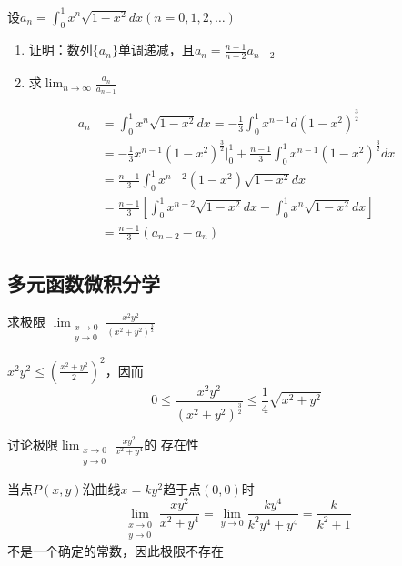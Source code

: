 \documentclass{article}
\begin{document}
\begin{examplle}[]
设\(a_n=\displaystyle\int_0^1x^n\sqrt{1-x^2}dx(n=0,1,2,\dots)\)
\begin{enumerate}
\item 证明：数列\(\{a_n\}\)单调递减，且\(a_n=\frac{n-1}{n+2}a_{n-2}\)
\item 求\(\displaystyle\lim_{n\to\infty}\frac{a_n}{a_{n-1}}\)
\end{enumerate}


\begin{align*}
a_n&=\int_0^1x^n\sqrt{1-x^2}dx=-\frac{1}{3}\int_0^1x^{n-1}d(1-x^2)^{\frac{3}{2}}\\
&=-\frac{1}{3}x^{n-1}(1-x^2)^{\frac{3}{2}}\Big\rvert_0^1+\frac{n-1}{3}
\int_0^1x^{n-1}(1-x^2)^{\frac{3}{2}}dx\\
&=\frac{n-1}{3}\int_0^1x^{n-2}(1-x^2)\sqrt{1-x^2}dx \\
&=\frac{n-1}{3}\left[
\int_0^1x^{n-2}\sqrt{1-x^2}dx-\int_0^1x^n\sqrt{1-x^2}dx
\right]\\
&=\frac{n-1}{3}(a_{n-2}-a_n)
\end{align*}
\end{examplle}
\subsection{多元函数微积分学}
\label{sec:org0dc937b}
\begin{examplle}[]
求极限
\(\displaystyle\lim_{\substack{x\to0\\y\to0}}\frac{x^2y^2}{(x^2+y^2)^{\frac{3}{2}}}\)

\(x^2y^2\le(\frac{x^2+y^2}{2})^2\)，因而
\begin{equation*}
0\le \frac{x^2y^2}{(x^2+y^2)^{\frac{3}{2}}}\le\frac{1}{4}\sqrt{x^2+y^2}
\end{equation*}
\end{examplle}

\begin{examplle}[]
讨论极限\(\displaystyle\lim_{\substack{x\to0\\y\to0}}\frac{xy^2}{x^2+y^4}\)的
存在性

当点\(P(x,y)\)沿曲线\(x=ky^2\)趋于点\((0,0)\)时
\begin{equation*}
\lim_{\substack{x\to0\\y\to0}}\frac{xy^2}{x^2+y^4}=
\lim_{y\to0}\frac{ky^4}{k^2y^4+y^4}=\frac{k}{k^2+1}
\end{equation*}
不是一个确定的常数，因此极限不存在
\end{examplle}
\end{document}
